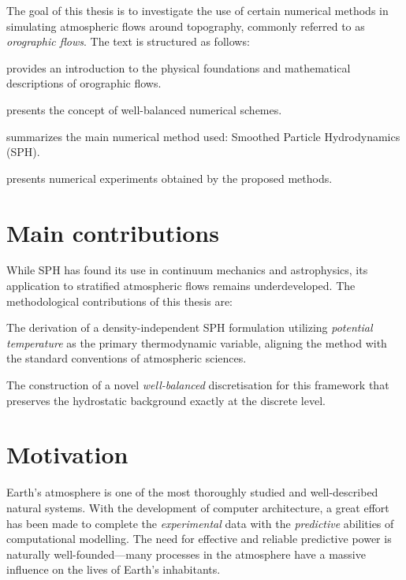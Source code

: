 \documentclass[../main.tex]{subfiles}
\begin{document}
\label{chap:Introduction}

The goal of this thesis is to investigate the use of certain numerical methods in simulating atmospheric flows around topography, commonly referred to as \emph{orographic flows}. The text is structured as follows:

\begin{compactenum}
    \item {} provides an introduction to the physical foundations and mathematical descriptions of orographic flows.
    \item {} presents the concept of well-balanced numerical schemes.
    \item {} summarizes the main numerical method used: Smoothed Particle Hydrodynamics (SPH). 
    \item {} presents numerical experiments obtained by the proposed methods.
\end{compactenum}

\section*{Main contributions}
While SPH has found its use in continuum mechanics and astrophysics, its application to stratified atmospheric flows remains underdeveloped. The methodological contributions of this thesis are:
\begin{compactenum}
    \item The derivation of a density-independent SPH formulation utilizing \emph{potential temperature} as the primary thermodynamic variable, aligning the method with the standard conventions of atmospheric sciences.
    \item The construction of a novel \emph{well-balanced} discretisation for this framework that preserves the hydrostatic background exactly at the discrete level. 
\end{compactenum}

\section*{Motivation}

Earth's atmosphere is one of the most thoroughly studied and well-described natural systems. With the development of computer architecture, a great effort has been made to complete the \emph{experimental} data with the \emph{predictive} abilities of computational modelling. The need for effective and reliable predictive power is naturally well-founded---many processes in the atmosphere have a massive influence on the lives of Earth's inhabitants.
\end{document}
